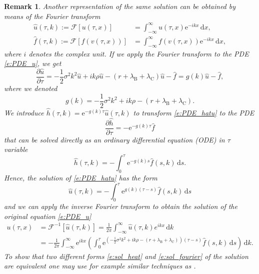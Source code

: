 \documentclass[a4paper,10pt]{article}
\newtheorem{remark}[theorem]{Remark}
\renewcommand{\d}{\,\mathrm{d}}
\newcommand{\dx}{\,\mathrm{d}x}
\newcommand{\e}{\mathrm{e}}
\newcommand{\1}{\mathbf{1}}
\begin{document}
\begin{remark}
Another representation of the same solution can be obtained by means of the Fourier transform
\begin{align}
\hat{u}(\tau,k):=\mathcal{F}\left[u(\tau,x)\right] &=\int_{-\infty}^{\infty}u(\tau,x) \e^{-i k x}\dx, \\
\hat{f}(\tau,k):=\mathcal{F}\left[f(v(\tau,x))\right] &= \int_{-\infty}^{\infty}f(v(\tau,x)) \e^{-i k x}\dx,
\end{align}
where $i$ denotes the complex unit. If we apply the Fourier transform to the PDE \eqref{e:PDE_u}, we get
\begin{equation}
\frac{\partial \hat{u}}{\partial \tau}
=-\frac{1}{2}\sigma^2 k^2 \hat{u}+i k\rho\hat{u}-(r+\lambda_\text{B}+\lambda_\text{C})\hat{u}-\hat{f}
=g(k)\hat{u}-\hat{f}, \label{e:PDE_hatu}
\end{equation}
where we denoted 
\begin{equation}\label{e:g}
g(k) = -\frac{1}{2}\sigma^2 k^2+ik\rho-(r+\lambda_\text{B}+\lambda_\text{C}). 
\end{equation}
We introduce $\hat{h}(\tau,k)=\e^{-g(k)\tau}\hat{u}(\tau,k)$ to transform \eqref{e:PDE_hatu} to the PDE
\begin{equation}
\frac{\partial \hat{h}}{\partial \tau} = -\e^{-g(k)\tau}\hat{f}
\end{equation}
that can be solved directly as an ordinary differential equation (ODE) in $\tau$ variable
\begin{equation}
\hat{h}(\tau,k) = -\int_{0}^{\tau} \e^{-g(k)s}\hat{f}(s,k)\d s.
\end{equation} 
Hence, the solution of \eqref{e:PDE_hatu} has the form
\begin{equation}
\hat{u}(\tau,k) = -\int_{0}^{\tau} \e^{g(k)(\tau-s)}\hat{f}(s,k)\d s 
\end{equation}
and we can apply the inverse Fourier transform to obtain the solution of the original equation \eqref{e:PDE_u}
\begin{align}
u(\tau,x) &= \mathcal{F}^{-1}\left[\hat{u}(\tau,k)\right] = \frac{1}{2\pi}\int_{-\infty}^{\infty}\hat{u}(\tau,k) e^{i k x}\d k \\
&= -\frac{1}{2\pi} \int_{-\infty}^{\infty} \e^{ikx} \left(\int_{0}^{\tau} \e^{(-\frac{1}{2}\sigma^2 k^2+ik\rho -(r+\lambda_\text{B}+\lambda_\text{C}))(\tau-s)}\hat{f}(s,k) \d s\right)\d k. \label{e:sol_fourier}
\end{align}
To show that two different forms \eqref{e:sol_heat} and \eqref{e:sol_fourier} of the solution are equivalent one may use for example similar techniques as \cite{BaustianMrazekPospisilSobotka17asmb}.
\end{remark}
\end{document}
